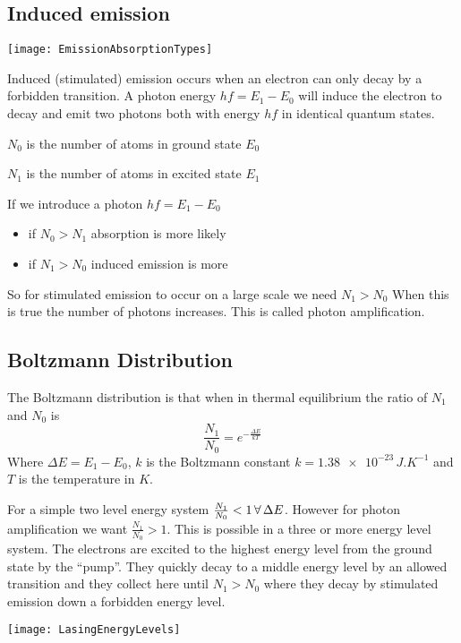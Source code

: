 \subsection*{Induced emission}

\begin{center}
\texttt{[image: EmissionAbsorptionTypes]}
\end{center}
Induced (stimulated) emission occurs when an electron can only decay by a forbidden transition. A photon energy \(hf=E_1-E_0\) will induce the electron to decay and emit two photons both with energy \(hf\) in identical quantum states.

\(N_0\) is the number of atoms in ground state \(E_0\)

\(N_1\) is the number of atoms in excited state \(E_1\)

If we introduce a photon \(hf=E_1-E_0\)
\begin{itemize}
\item if \(N_0>N_1\) absorption is more likely
\item if \(N_1>N_0\) induced emission is more
\end{itemize}
So for stimulated emission to occur on a large scale we need \(N_1>N_0\) When this is true the number of photons increases. This is called photon amplification.

\subsection*{Boltzmann Distribution}

The Boltzmann distribution is that when in thermal equilibrium the ratio of \(N_1\) and \(N_0\) is
\[\frac{N_1}{N_0}=e^{-\frac{\Delta E}{kT}}\]
Where \(\Delta E=E_1-E_0\), \(k\) is the Boltzmann constant \(k=\num{1.38e-23}\,\si{J.K^{-1}}\) and \(T\) is the temperature in \(K\).

For a simple two level energy system \(\frac{N_1}{N_0}<1\,\forall\, \Delta E\). However for photon amplification we want \(\frac{N_1}{N_0}>1\). This is possible in a three or more energy level system. The electrons are excited to the highest energy level from the ground state by the ``pump''. They quickly decay to a middle energy level by an allowed transition and they collect here until \(N_1>N_0\) where they decay by stimulated emission down a forbidden energy level.

\begin{center}
\texttt{[image: LasingEnergyLevels]}
\end{center}

